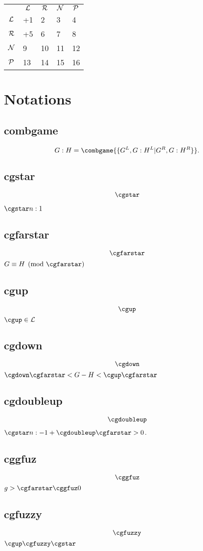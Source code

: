 \documentclass[11pt,twoside]{article}
\begin{document}
    \begin{tabular}{cllll}
    & \multicolumn{1}{c}{$\mathcal{L}$}   & \multicolumn{1}{c}{$\mathcal{R}$} & \multicolumn{1}{c}{$\mathcal{N}$} & \multicolumn{1}{c}{$\mathcal{P}$}   \\ \cline{2-5} 
    \multicolumn{1}{c|}{$\mathcal{L}$} & \multicolumn{1}{l|}{+1} & \multicolumn{1}{l|}{2} & \multicolumn{1}{l|}{3} & \multicolumn{1}{l|}{4} \\ \cline{2-5} 
    \multicolumn{1}{c|}{$\mathcal{R}$} & \multicolumn{1}{l|}{+5}   & \multicolumn{1}{l|}{6} & \multicolumn{1}{l|}{7} & \multicolumn{1}{l|}{8}   \\ \cline{2-5} 
    \multicolumn{1}{c|}{$\mathcal{N}$} & \multicolumn{1}{l|}{9}   & \multicolumn{1}{l|}{10} & \multicolumn{1}{l|}{11} & \multicolumn{1}{l|}{12}   \\ \cline{2-5} 
    \multicolumn{1}{c|}{$\mathcal{P}$} & \multicolumn{1}{l|}{13} & \multicolumn{1}{l|}{14} & \multicolumn{1}{l|}{15} & \multicolumn{1}{l|}{16} \\ \cline{2-5} 
    \end{tabular}

\section{Notations}

\subsection{combgame}
\[G:H=\combgame{\{G^L,G:H^L|G^R,G:H^R\}}.\]

\subsection{cgstar}
\[\cgstar\]

$\cgstar n:1$

\subsection{cgfarstar} 
\[\cgfarstar\]
$G\equiv H\pmod{\cgfarstar}$

\subsection{cgup}
\[\cgup\]
$\cgup\in\mcL$
\subsection{cgdown}
\[\cgdown\]
$\cgdown\cgfarstar<G-H<\cgup\cgfarstar$

\subsection{cgdoubleup}
\[\cgdoubleup\]
$\cgstar n:-1+\cgdoubleup\cgfarstar > 0$.

\subsection{cggfuz}
\[\cggfuz\]
$g>\cgfarstar\cggfuz 0$

\subsection{cgfuzzy}
\[\cgfuzzy\]
$\cgup\cgfuzzy\cgstar$
\end{document}
